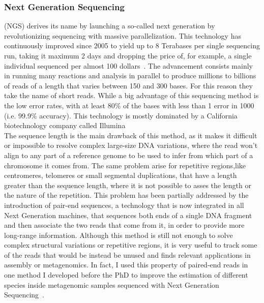 \subsubsection*{Next Generation Sequencing} (NGS) derives its name by launching a so-called next generation by revolutionizing sequencing with massive parallelization. This technology has continuously improved since 2005 to yield up to 8 Terabases per single sequencing run, taking it maximum 2 days and dropping the price of, for example, a single individual sequenced per almost 100 dollars~\cite{100dollars}. The advancement consists mainly in running many reactions and analysis in parallel to produce millions to billions of reads of a length that varies between 150 and 300 bases. For this reason they take the name of short reads. While a big advantage of this sequencing method is the low error rates, with at least 80\% of the bases with less than 1 error in 1000 (i.e. 99.9\% accuracy). This technology is mostly dominated by a California biotechnology company called Illumina \\
The sequence length is the main drawback of this method, as it makes it difficult or impossible to resolve complex large-size DNA variations, where the read won't align to any part of a reference genome to be used to infer from which part of a chromosome it comes from. The same problem arise for repetitive regions,like centromeres, telomeres or small segmental duplications, that have a length greater than the sequence length, where it is not possible to asses the length or the nature of the repetition.
This problem has been partially addressed by the introduction of pair-end sequences, a technology that is now integrated in all Next Generation machines, that sequences both ends of a single DNA fragment and then associate the two reads that come from it, in order to provide more long-range information. Although this method is still not enough to solve complex structural variations or repetitive regions, it is very useful to track some of the reads that would be instead be unused and finds relevant applications in assembly or metagenomics. In fact, I used this property of paired-end reads in one method I developed before the PhD to improve the estimation of different species inside metagenomic samples sequenced with Next Generation Sequencing~\cite{metaprob2}. \\
